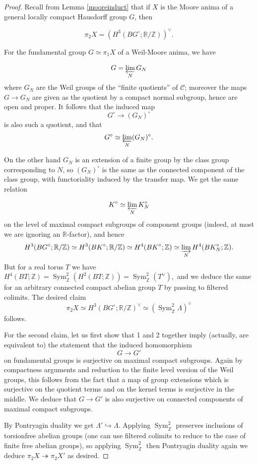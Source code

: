 \documentclass[12pt]{article}
\theoremstyle{definition}
\newcommand{\on}{\operatorname}
\newcommand{\mc}{\mathcal}
\newcommand{\mbb}{\mathbb}
\begin{document}
\begin{proof}
Recall from Lemma \ref{mooreinduct} that if $X$ is the Moore anima of a general locally compact Hausdorff group $G$, then 

$$\pi_2X = \left(H^3(BG^\circ;\mbb{R}/\mbb{Z})\right)^\vee.$$

For the fundamental group $G\simeq \pi_1X$ of a Weil-Moore anima, we have

$$G = \varprojlim_N G_N$$
where $G_N$ are the Weil groups of the ``finite quotients'' of $\mc{C}$; moreover the maps $G \to G_N$ are given as the quotient by a compact normal subgroup, hence are open and proper.  It follows that the induced map
$$G^\circ \to (G_N)^\circ$$
is also such a quotient, and that
$$G^\circ \simeq \varprojlim_N (G_N)^\circ.$$ 

On the other hand $G_N$ is an extension of a finite group by the class group corresponding to $N$, so $(G_N)^\circ$ is the same as the connected component of the class group, with functoriality induced by the transfer map.  We get the same relation

$$K^\circ \simeq \varprojlim_N K_N^\circ$$
on the level of maximal compact subgroups of component groups (indeed, at most we are ignoring an $\mbb{R}$-factor), and hence
$$H^3(BG^\circ;\mbb{R}/\mbb{Z})\simeq H^3(BK^\circ;\mbb{R}/\mbb{Z})\simeq H^4(BK^\circ;\mbb{Z})\simeq \varinjlim_N H^4(BK_N^\circ;\mbb{Z}).$$
But for a real torus $T$ we have $H^4(BT;\mbb{Z})=\on{Sym}^2_{\mbb{Z}}(H^2(BT;\mbb{Z})) = \on{Sym}^2_{\mbb{Z}}(T^\vee),$
and we deduce the same for an arbitrary connected compact abelian group $T$ by passing to filtered colimits.  The desired claim
$$\pi_2 X \simeq H^3(BG^\circ;\mbb{R}/\mbb{Z})^\vee\simeq \left(\on{Sym}^2_{\mbb{Z}}\Lambda\right)^\vee$$
follows.

For the second claim, let us first show that 1 and 2 together imply (actually, are equivalent to) the statement that the induced homomorphism
$$G \to G'$$
on fundamental groups is surjective on maximal compact subgroups.  Again by compactness arguments and reduction to the finite level version of the Weil groups, this follows from the fact that a map of group extensions which is surjective on the quotient terms and on the kernel terms is surjective in the middle.  We deduce that $G\to G'$ is also surjective on connected components of maximal compact subgroups.

By Pontryagin duality we get $\Lambda' \hookrightarrow \Lambda$.  Applying $\on{Sym}^2_{\mbb{Z}}$ preserves inclusions of torsionfree abelian groups (one can use filtered colimits to reduce to the case of finite free abelian groups), so applying $\on{Sym}^2_{\mbb{Z}}$ then Pontryagin duality again we deduce $\pi_2X \twoheadrightarrow \pi_2X'$ as desired.
\end{proof}
\end{document}
